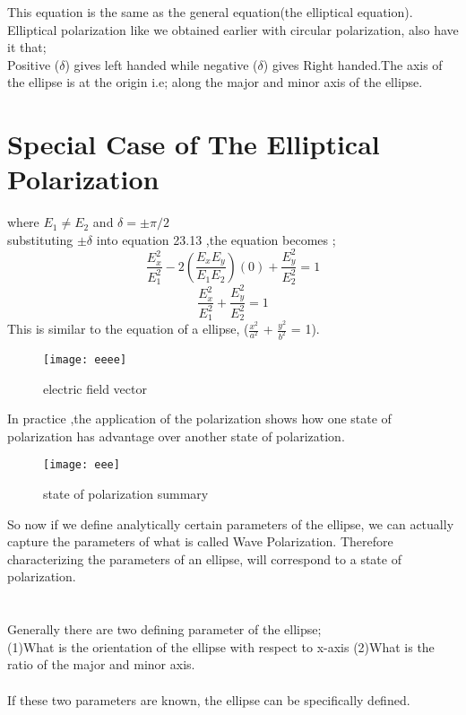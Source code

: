 This equation is the same as the general equation(the elliptical equation). Elliptical polarization	like we obtained earlier with circular polarization, also have it that;\\
Positive ($\delta$) gives left handed while negative ($\delta$) gives Right handed.The axis of the ellipse is at the origin i.e; along the major and minor axis of the ellipse.

\section{Special Case of  The Elliptical Polarization}
 where $E_1\neq E_2$ and $\delta = \pm \pi/2 $ 
\\
substituting $\pm \delta$ into equation 23.13 ,the equation becomes ;
\begin{equation}
\frac{E_{x}^2}{E_{1}^2} -2(\frac{E_{x}E_{y}}{E_{1}E_{2}})(0) + \frac{E_{y}^2}{E_{2}^2} = 1
\end{equation}
\begin{equation}
\frac{E_{x}^2}{E_{1}^2} + \frac{E_{y}^2}{E_{2}^2} = 1
\end{equation}
This is similar to the equation of a ellipse, ($\frac{x^2}{a^2}$ + $\frac{y^2}{b^2}$ = 1).
\begin{figure}
	\centering
	\texttt{[image: eeee]}
	\caption{electric field vector}
\end{figure}
 In practice ,the application of the polarization shows how one state of polarization has advantage over another state of polarization.

\begin{figure}
	\centering
	\texttt{[image: eee]}
	\caption{state of polarization summary}
\end{figure}

So now if we define analytically certain parameters of the ellipse, we can actually capture the parameters of what is called Wave Polarization. Therefore characterizing the parameters of an ellipse, will correspond to a state of polarization.\\
\\
\\
Generally there are two defining parameter of the ellipse;
\\
(1)What is the orientation of the ellipse with respect to x-axis 
(2)What is the ratio of the major and minor axis.\\
\\
If these two parameters are known, the ellipse can be specifically defined.


